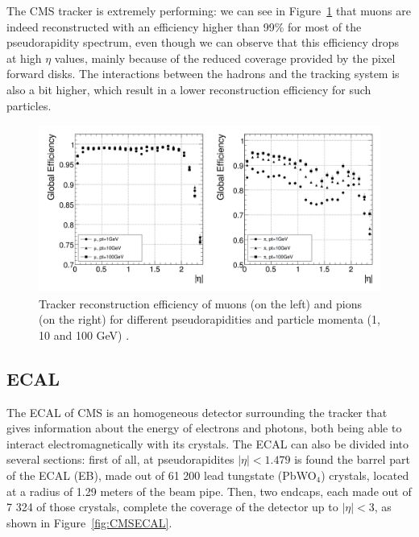 \documentclass[a4paper, 10pt, openright]{report}
\begin{document}
The \ac{CMS} tracker is extremely performing: we can see in Figure~\ref{fig:TrackerEff} that muons are indeed reconstructed with an efficiency higher than 99\% for most of the pseudorapidity spectrum, even though we can observe that this efficiency drops at high $\eta$ values, mainly because of the reduced coverage provided by the pixel forward disks. The interactions between the hadrons and the tracking system is also a bit higher, which result in a lower reconstruction efficiency for such particles.

\begin{figure}[htbp]
\begin{center}
\includegraphics[width=12cm, height=5.5cm]{figs/TrackerEff.png}
\caption{Tracker reconstruction efficiency of muons (on the left) and pions (on the right) for different pseudorapidities and particle momenta (1, 10 and 100 GeV) \cite{CMSDescription}.}
\label{fig:TrackerEff}
\end{center}
\end{figure}

\subsection{\acf{ECAL}} \label{subsection:ECAL}

The \acf{ECAL} of CMS is an homogeneous detector surrounding the tracker that gives information about the energy of electrons and photons, both being able to interact electromagnetically with its crystals. The \ac{ECAL} can also be divided into several sections: first of all, at pseudorapidites $|\eta| < 1.479$ is found the barrel part of the \ac{ECAL} (EB), made out of 61 200 lead tungstate (PbWO$_4$) crystals, located at a radius of 1.29 meters of the beam pipe. Then, two endcaps, each made out of 7 324 of those crystals, complete the coverage of the detector up to $|\eta| < 3$, as shown in Figure~\ref{fig:CMSECAL}.
\end{document}
